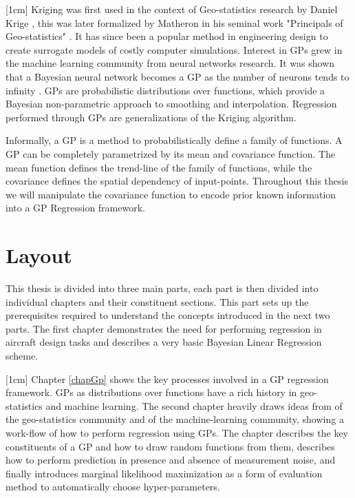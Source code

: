[1cm]
Kriging was first used in the context of Geo-statistics research by Daniel Krige \cite{krige1951statistical}, this was later formalized by Matheron in his seminal work "Principals of Geo-statistics" \cite{matheron1963principles}. It has since been a popular method in engineering design to create surrogate models of costly computer simulations. Interest in GPs grew in the machine learning community from neural networks research. It was shown that a Bayesian neural network becomes a GP as the number of neurons tends to infinity \cite{neal2012bayesian}. GPs are probabilistic distributions over functions, which provide a Bayesian non-parametric approach to smoothing and interpolation. Regression performed through GPs are generalizations of the Kriging algorithm. 

Informally, a GP is a method to probabilistically define a family of functions. A GP can be completely parametrized by its mean and covariance function. The mean function defines the trend-line of the family of functions, while the covariance defines the spatial dependency of input-points. Throughout this thesis we will manipulate the covariance function to encode prior known information into a GP Regression framework. 

\section{Layout}\label{secOutline}
This thesis is divided into three main parts, each part is then divided into individual chapters and their constituent sections. This part sets up the prerequisites required to understand the concepts introduced in the next two parts. The first chapter demonstrates the need for performing regression in aircraft design tasks and describes a very basic Bayesian Linear Regression scheme. 

[1cm]
Chapter \ref{chapGp} shows the key processes involved in a GP regression framework. GPs as distributions over functions have a rich history in geo-statistics and machine learning. The second chapter heavily draws ideas from \cite{krige1951statistical, matheron1963principles} of the geo-statistics community and \cite{Stein1999Springer, kennedy2000predicting, Rasmussen2005, mackay2003information} of the machine-learning community, showing a work-flow of how to perform regression using GPs. The chapter describes the key constituents of a GP and how to draw random functions from them, describes how to perform prediction in presence and absence of measurement noise, and finally introduces marginal likelihood maximization as a form of evaluation method to automatically choose hyper-parameters. 

